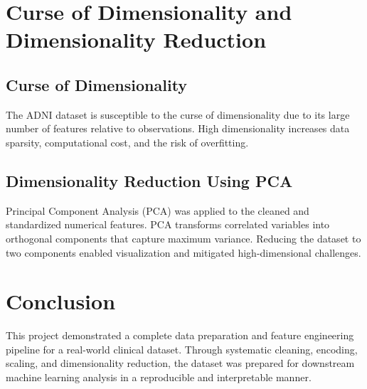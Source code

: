 \documentclass[11pt]{article}
\begin{document}
\section{Curse of Dimensionality and Dimensionality Reduction}

\subsection{Curse of Dimensionality}
The ADNI dataset is susceptible to the curse of dimensionality due to its large number of features relative to observations. High dimensionality increases data sparsity, computational cost, and the risk of overfitting.

\subsection{Dimensionality Reduction Using PCA}
Principal Component Analysis (PCA) was applied to the cleaned and standardized numerical features. PCA transforms correlated variables into orthogonal components that capture maximum variance. Reducing the dataset to two components enabled visualization and mitigated high-dimensional challenges.

\section{Conclusion}
This project demonstrated a complete data preparation and feature engineering pipeline for a real-world clinical dataset. Through systematic cleaning, encoding, scaling, and dimensionality reduction, the dataset was prepared for downstream machine learning analysis in a reproducible and interpretable manner.
\end{document}
